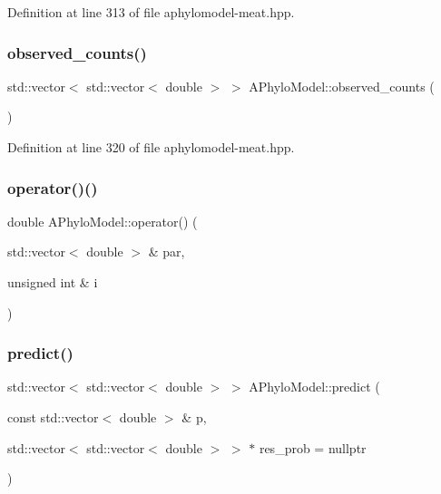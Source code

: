 Definition at line 313 of file aphylomodel-\/meat.\+hpp.

\mbox{\label{class_a_phylo_model_ac101dec16afb5d1c957fa1ccdca45c63}} 
\subsubsection{\texorpdfstring{observed\+\_\+counts()}{observed\_counts()}}
{\footnotesize\ttfamily std\+::vector$<$ std\+::vector$<$ double $>$ $>$ A\+Phylo\+Model\+::observed\+\_\+counts (\begin{DoxyParamCaption}{ }\end{DoxyParamCaption})\hspace{0.3cm}{\ttfamily [inline]}}



Definition at line 320 of file aphylomodel-\/meat.\+hpp.

\mbox{\label{class_a_phylo_model_a9b3390c29ea7a3283e68e9a059b94138}} 
\subsubsection{\texorpdfstring{operator()()}{operator()()}}
{\footnotesize\ttfamily double A\+Phylo\+Model\+::operator() (\begin{DoxyParamCaption}\item[{std\+::vector$<$ double $>$ \&}]{par,  }\item[{unsigned int \&}]{i }\end{DoxyParamCaption})}

\mbox{\label{class_a_phylo_model_a5818916d43989b8a8dfa42b1fbde8e5c}} 
\subsubsection{\texorpdfstring{predict()}{predict()}}
{\footnotesize\ttfamily std\+::vector$<$ std\+::vector$<$ double $>$ $>$ A\+Phylo\+Model\+::predict (\begin{DoxyParamCaption}\item[{const std\+::vector$<$ double $>$ \&}]{p,  }\item[{std\+::vector$<$ std\+::vector$<$ double $>$ $>$ $\ast$}]{res\+\_\+prob = {\ttfamily nullptr} }\end{DoxyParamCaption})\hspace{0.3cm}{\ttfamily [inline]}}



